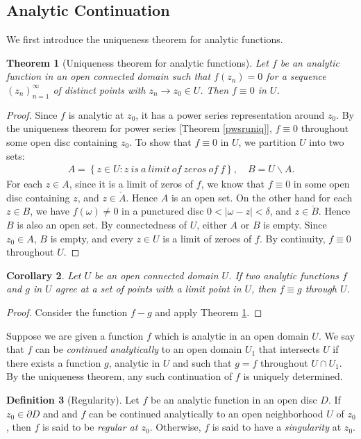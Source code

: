 \documentclass{article}
\numberwithin{equation}{section}
\theoremstyle{plain}
\newtheorem{theorem}{Theorem}[section]
\newtheorem{corollary}[theorem]{Corollary}
\theoremstyle{definition}
\newtheorem{definition}[theorem]{Definition}
\begin{document}
\subsection{Analytic Continuation}
We first introduce the uniqueness theorem for analytic functions.
\begin{theorem}[Uniqueness theorem for analytic functions]\label{analuniq}
Let $f$ be an analytic function in an open connected domain such that $f(z_n)=0$ for a sequence $(z_n)_{n=1}^\infty$ of distinct points with $z_n\to z_0\in U$. Then $f\equiv 0$ in $U$.
\end{theorem}
\begin{proof}
Since $f$ is analytic at $z_0$, it has a power series representation around $z_0$. By the uniqueness theorem for power series [Theorem \ref{pwsruniq}], $f\equiv 0$ throughout some open disc containing $z_0$. To show that $f\equiv 0$ in $U$, we partition $U$ into two sets:
\begin{align*}
	A=\left\{z\in U:z\ is\ a\ limit\ of\ zeros\ of\ f\right\},\quad B=U\backslash A.
\end{align*}
For each $z\in A$, since it is a limit of zeros of $f$, we know that $f\equiv 0$ in some open disc containing $z$, and $z\in\mathring{A}$. Hence $A$ is an open set. On the other hand for each $z\in B$, we have $f(\omega)\neq 0$ in a punctured disc $0<\vert\omega-z\vert<\delta$, and $z\in\mathring{B}$. Hence $B$ is also an open set. By connectedness of $U$, either $A$ or $B$ is empty. Since $z_0\in A$, $B$ is empty, and every $z\in U$ is a limit of zeroes of $f$. By continuity, $f\equiv 0$ throughout $U$.
\end{proof}
\begin{corollary}
Let $U$ be an open connected domain $U$. If two analytic functions $f$ and $g$ in $U$ agree at a set of points with a limit point in $U$, then $f\equiv g$ through $U$.
\end{corollary}
\begin{proof}
Consider the function $f-g$ and apply Theorem \ref{analuniq}.
\end{proof}
Suppose we are given a function $f$ which is analytic in an open domain $U$. We say that $f$ can be \textit{continued analytically} to an open domain $U_1$ that intersects $U$ if there exists a function $g$, analytic in $U$ and such that $g = f$ throughout $U\cap U_1$. By the uniqueness theorem, any such continuation of $f$ is uniquely determined. 
\begin{definition}[Regularity]
Let $f$ be an analytic function in an open disc $D$. If $z_0\in\partial D$ and and $f$ can be continued analytically to an open neighborhood $U$ of $z_0$, then $f$ is said to be \textit{regular at $z_0$}. Otherwise, $f$ is said to have a \textit{singularity} at $z_0$. 
\end{definition}
\end{document}
